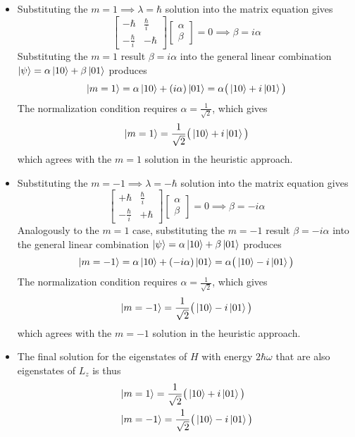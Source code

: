 \documentclass[11pt, a4paper]{article}
\begin{document}
\begin{itemize}
	\item Substituting the $ m = 1 \implies \lambda = \hbar $ solution into the matrix equation gives
	\begin{equation*}
		\begin{bmatrix}
			-\hbar & \frac{\hbar}{i}\\
			-\frac{\hbar}{i} & -\hbar
		\end{bmatrix}
		\begin{bmatrix}
			\alpha\\
			\beta
		\end{bmatrix}
		= 0 \implies \beta = i \alpha
	\end{equation*}
	Substituting the $ m = 1 $ result $ \beta = i \alpha $ into the general linear combination $ \ket{\psi} = \alpha \ket{10} + \beta \ket{01} $ produces
	\begin{equation*}
		\ket{m=1} = \alpha \ket{10} + (i\alpha)\ket{01} = \alpha \big(\ket{10} + i \ket{01}\big)
	\end{equation*}
	The normalization condition requires $ \alpha = \frac{1}{\sqrt{2}} $, which gives
	\begin{equation*}
		\ket{m=1} = \frac{1}{\sqrt{2}}\big(\ket{10} + i \ket{01}\big)
	\end{equation*}
	which agrees with the $ m = 1 $ solution in the heuristic approach.
	
	\item Substituting the $ m = - 1 \implies \lambda = -\hbar $ solution into the matrix equation gives
	\begin{equation*}
		\begin{bmatrix}
			+\hbar & \frac{\hbar}{i}\\
			-\frac{\hbar}{i} & +\hbar
		\end{bmatrix}
		\begin{bmatrix}
			\alpha\\
			\beta
		\end{bmatrix}
		= 0 \implies \beta = - i \alpha
	\end{equation*}
	Analogously to the $ m = 1 $ case, substituting the $ m = -1 $ result $ \beta = -i \alpha $ into the general linear combination $ \ket{\psi} = \alpha \ket{10} + \beta \ket{01} $ produces
	\begin{equation*}
		\ket{m=-1} = \alpha \ket{10} + (-i\alpha)\ket{01} = \alpha \big(\ket{10} - i \ket{01}\big)
	\end{equation*}
	The normalization condition requires $ \alpha = \frac{1}{\sqrt{2}} $, which gives
	\begin{equation*}
		\ket{m=-1} = \frac{1}{\sqrt{2}}\big(\ket{10} - i \ket{01}\big)
	\end{equation*}
	which agrees with the $ m = - 1 $ solution in the heuristic approach.
	
	\item The final solution for the eigenstates of $ H $ with energy $ 2\hbar \omega $ that are also eigenstates of $ L_{z} $ is thus
	\begin{align*}
		&\ket{m=1} = \frac{1}{\sqrt{2}}\big(\ket{10} + i \ket{01}\big)\\
		&\ket{m=-1} = \frac{1}{\sqrt{2}}\big(\ket{10} - i \ket{01}\big)
	\end{align*}
\end{itemize}
\end{document}
